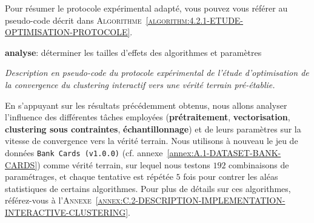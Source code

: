 			Pour résumer le protocole expérimental adapté, vous pouvez vous référer au pseudo-code décrit dans \textsc{Algorithme~\ref{algorithm:4.2.1-ETUDE-OPTIMISATION-PROTOCOLE}}.
			
			\begin{algorithm}
				\textbf{analyse}: déterminer les tailles d'effets des algorithmes et paramètres \;
				\caption{\textit{
					Description en pseudo-code du protocole expérimental de l'étude d'optimisation de la convergence du \textit{clustering} interactif vers une vérité terrain pré-établie.
				}}
				\label{algorithm:4.2.1-ETUDE-OPTIMISATION-PROTOCOLE}
			\end{algorithm}
			
			En s'appuyant sur les résultats précédemment obtenus,
			nous allons analyser l'influence des différentes tâches employées (\textbf{prétraitement}, \textbf{vectorisation}, \textbf{clustering sous contraintes}, \textbf{échantillonnage}) et de leurs paramètres sur la vitesse de convergence vers la vérité terrain.
			Nous utilisons à nouveau le jeu de données \texttt{Bank Cards (v1.0.0)} (cf. annexe~\ref{annex:A.1-DATASET-BANK-CARDS}) comme vérité terrain, sur lequel nous testons $192$ combinaisons de paramétrages, et chaque tentative est répétée $5$ fois pour contrer les aléas statistiques de certains algorithmes.
			Pour plus de détails sur ces algorithmes, référez-vous à l'\textsc{Annexe~\ref{annex:C.2-DESCRIPTION-IMPLEMENTATION-INTERACTIVE-CLUSTERING}}.
			
